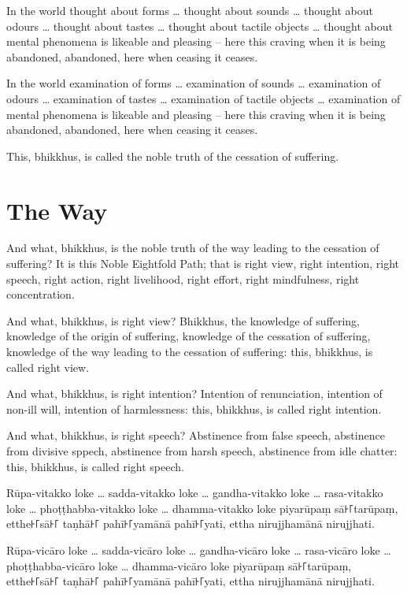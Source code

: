 \englishPage

In the world thought about forms \ldots{} thought about sounds \ldots{} thought
about odours \ldots{} thought about tastes \ldots{} thought about tactile
objects \ldots{} thought about mental phenomena is likeable and pleasing -- here
this craving when it is being abandoned, abandoned, here when ceasing it ceases.

In the world examination of forms \ldots{} examination of sounds \ldots{}
examination of odours \ldots{} examination of tastes \ldots{} examination of
tactile objects \ldots{} examination of mental phenomena is likeable and
pleasing -- here this craving when it is being abandoned, abandoned, here when
ceasing it ceases.

This, bhikkhus, is called the noble truth of the cessation of suffering.

\section{The Way}

And what, bhikkhus, is the noble truth of the way leading to the cessation of
suffering? It is this Noble Eightfold Path; that is right view, right intention,
right speech, right action, right livelihood, right effort, right mindfulness,
right concentration.

And what, bhikkhus, is right view? Bhikkhus, the knowledge of suffering,
knowledge of the origin of suffering, knowledge of the cessation of suffering,
knowledge of the way leading to the cessation of suffering: this, bhikkhus, is
called right view.

And what, bhikkhus, is right intention? Intention of renunciation, intention of
non-ill will, intention of harmlessness: this, bhikkhus, is called right
intention.

And what, bhikkhus, is right speech? Abstinence from false speech, abstinence
from divisive sppech, abstinence from harsh speech, abstinence from idle
chatter: this, bhikkhus, is called right speech.

\paliPage

Rūpa-vitakko loke \ldots{} sadda-vitakko loke \ldots{} gandha-vitakko loke \ldots{}
rasa-vitakko loke \ldots{} phoṭṭhabba-vitakko loke \ldots{} dhamma-vitakko loke
piyarūpaṃ sā꜔꜒tarūpaṃ, etthe꜔꜒sā꜔꜒ taṇhā꜔꜒ pahī꜔꜒yamānā pahī꜔꜒yati, ettha nirujjhamānā
nirujjhati.

Rūpa-vicāro loke \ldots{} sadda-vicāro loke \ldots{} gandha-vicāro loke \ldots{}
rasa-vicāro loke \ldots{} phoṭṭhabba-vicāro loke \ldots{} dhamma-vicāro loke
piyarūpaṃ sā꜔꜒tarūpaṃ, etthe꜔꜒sā꜔꜒ taṇhā꜔꜒ pahī꜔꜒yamānā pahī꜔꜒yati, ettha nirujjhamānā
nirujjhati.

